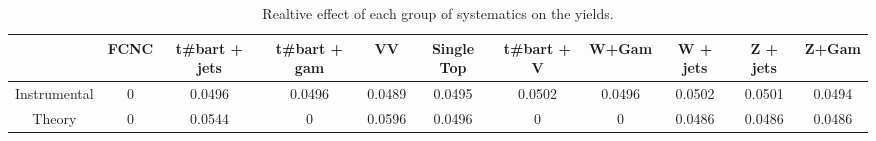 \begin{table}[htbp]
\begin{center}
\begin{tabular}{|c|c|c|c|c|c|c|c|c|c|c|}
\hline 
      & FCNC      & t#bar{t} + jets      & t#bar{t} +  gam      & VV      & Single Top      & t#bar{t} + V      & W+Gam      & W + jets      & Z + jets      & Z+Gam \\ 
\hline 
 Instrumental & 0 & 0.0496 & 0.0496 & 0.0489 & 0.0495 & 0.0502 & 0.0496 & 0.0502 & 0.0501 & 0.0494 \\ 
 Theory & 0 & 0.0544 & 0 & 0.0596 & 0.0496 & 0 & 0 & 0.0486 & 0.0486 & 0.0486 \\ 
\hline 
\end{tabular} 
\caption{Realtive effect of each group of systematics on the yields.} 
\end{center} 
\end{table} 

